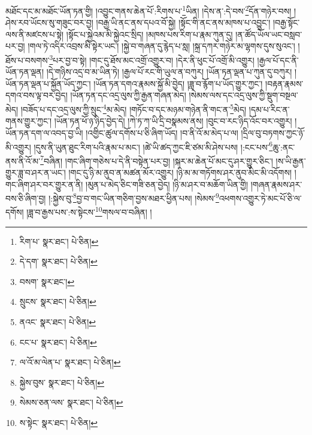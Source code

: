 མཐོང་དང་མ་མཐོང་ཡོན་ཏན་གྱི། །འབྱུང་གནས་ཆེན་པོ་:རིགས་པ་\footnote{རིག་པ་  སྣར་ཐང་།  པེ་ཅིན། }ཡིན། །དེས་ན་:དེ་བས་\footnote{དེ་དག་  སྣར་ཐང་།  པེ་ཅིན། }དོན་གཉེར་བས། །ཤེས་རབ་ཡོངས་སུ་གཟུང་བར་བྱ། །བརྒྱ་ཡི་ནང་ནས་དཔའ་བོ་སྐྱེ། །སྟོང་གི་ནང་ནས་མཁས་པ་འབྱུང་། །བརྒྱ་སྟོང་ལས་ནི་མཛངས་པ་སྟེ། །སྟོང་པ་སྐྱེའམ་མི་སྐྱེའང་སྲིད། །མཁས་པས་རིག་པ་རྣམ་ཀུན་དུ། །ན་ཚོད་ཡོལ་ཡང་བསླབ་པར་བྱ། །གལ་ཏེ་འདིར་འབྲས་མི་སྟེར་ཡང་། །སྐྱེ་བ་གཞན་དུ་རྙེད་པ་སླ། །སྐྲ་དཀར་གཉེར་མ་ལྷགས་དུས་སུའང་། །ཐོས་པ་བསགས་\footnote{བསག་  སྣར་ཐང་། }པར་བྱ་བ་སྟེ། །གང་དུ་ཐོས་མང་འགྲོ་འགྱུར་བ། །དེར་ནི་ཕུང་པོ་འགྲོ་མི་འགྱུར། །རྒྱལ་པོ་དང་ནི་ཡོན་ཏན་ལྡན། །དེ་གཉིས་འདྲ་བ་མ་ཡིན་ཏེ། །རྒྱལ་པོ་རང་གི་ཡུལ་ན་བཀུར། །ཡོན་ཏན་ལྡན་པ་ཀུན་དུ་བཀུར། །ཡོན་ཏན་ལྡན་པ་སྐྱོན་ཡོད་ཀྱང་། །ཡོན་ཏན་དགའ་རྣམས་སྐྱོ་མི་བྱེད། །ཟླ་བ་རྙོག་པ་ཡོད་གྱུར་ཀྱང་། །བརྟན་རྣམས་དགའ་བས་ལྟ་བར་བྱེད། །ཡོན་ཏན་དང་འདྲ་ལུས་ཀྱི་རྒྱན་གཞན་མེད། །སེམས་ལས་དང་འདྲ་ལུས་ཀྱི་སྡུག་བསྔལ་མེད། །བཟོད་པ་དང་འདྲ་ལུས་ཀྱི་སྲུང་\footnote{སྲུངས་  སྣར་ཐང་།  པེ་ཅིན། }མ་མེད། །གཏོང་བ་དང་མཉམ་གཉེན་ནི་གང་ན་\footnote{ནའང་  སྣར་ཐང་།  པེ་ཅིན། }མེད། །དམ་པ་རིང་ན་གནས་གྱུར་ཀྱང་། །ཡོན་ཏན་ཕོ་ཉ་ཉིད་བྱེད་དེ། །ཀེ་ཏ་ཀ་ཡི་དྲི་བསྣམས་ནས། །བུང་བ་རང་ཉིད་འོང་བར་འགྱུར། །ཡོན་ཏན་དག་ལ་འབད་བྱ་ཡི། །འགྱིང་ཚུལ་དགོས་པ་ཅི་ཞིག་ཡོད། །བ་ནི་འོ་མ་མེད་པ་ལ། །དྲིལ་བུ་བཏགས་ཀྱང་ཉོ་མི་འགྱུར། །དུས་ནི་ཡུན་ཐུང་རིག་པའི་རྣམ་པ་མང་། །ཚེ་ཡི་ཚད་ཀྱང་ཇི་ཙམ་མི་ཤེས་པས། །:ངང་པས་\footnote{ངང་པ་  སྣར་ཐང་།  པེ་ཅིན། }ཆུ་:ནང་ནས་ནི་འོ་མ་\footnote{ལ་འོ་མ་ལེན་པ་  སྣར་ཐང་།  པེ་ཅིན། }བཞིན། །གང་ཞིག་གཅེས་པ་དེ་ནི་བསྟེན་པར་བྱ། །སྐར་མ་ཆེན་པོ་མང་དུ་ཤར་གྱུར་ཅིང་། །ས་ཡི་རྒྱན་གྱུར་ཟླ་བ་ཤར་ན་ཡང་། །གང་དུ་ཉི་མ་ནུབ་ན་མཚན་མོར་འགྱུར། །ཉི་མ་མ་གཏོགས་ཤར་ནུབ་མིང་མི་འདོགས། །གང་ཞིག་ཤར་བར་གྱུར་ན་ནི། །མུན་པ་མེད་ཅིང་གཟི་ཅན་བྱེད། །ཉི་མ་ཤར་བ་མཆོག་ཡིན་གྱི། །གཞན་རྣམས་ཤར་བས་ཅི་ཞིག་བྱ། །:སྐྱེས་བུ་\footnote{སྐྱེས་བུས་  སྣར་ཐང་།  པེ་ཅིན། }བྱ་བ་གང་ཡིན་གཅིག་བྱས་མཐར་ཕྱིན་པས། །སེམས་\footnote{སེམས་ཅན་ལས་  སྣར་ཐང་།  པེ་ཅིན། }འཕགས་འགྱུར་ཏེ་མང་པོ་ཅི་ལ་དགོས། །ཟླ་བ་རྒྱས་པས་:ས་སྟེངས་\footnote{ས་སྟེང་  སྣར་ཐང་།  པེ་ཅིན། }གསལ་བ་བཞིན། །
